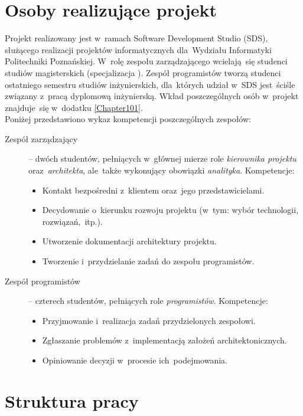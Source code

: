 \section{Osoby realizujące projekt}
\label{Chapter14}

Projekt realizowany jest w~ramach Software Development Studio (SDS), służącego realizacji projektów informatycznych dla~Wydziału Informatyki Politechniki Poznańskiej. W~rolę zespołu zarządzającego wcielają~się studenci studiów magisterskich (specjalizacja ). Zespół programistów tworzą studenci ostatniego semestru studiów inżynierskich, dla~których udział w~SDS jest~ściśle związany z~pracą dyplomową inżynierską. Wkład poszczególnych osób w~projekt znajduje~się w~dodatku \ref{Chapter101}. \\

Poniżej przedstawiono wykaz kompetencji poszczególnych zespołów:
\begin{description}
\item[Zespół zarządzający] -- dwóch studentów, pełniących w~głównej mierze role \emph{kierownika projektu} oraz~\emph{architekta}, ale~także wykonujący obowiązki \emph{analityka}. Kompetencje:
\begin{itemize}
\item Kontakt bezpośredni z~klientem oraz~jego przedstawicielami.
\item Decydowanie o~kierunku rozwoju projektu (w~tym: wybór technologii, rozwiązań,~itp.).
\item Utworzenie dokumentacji architektury projektu.
\item Tworzenie i~przydzielanie zadań do zespołu programistów.
\end{itemize}
\item[Zespół programistów] -- czterech studentów, pełniących role \emph{programistów}. Kompetencje:
\begin{itemize}
\item Przyjmowanie i~realizacja zadań przydzielonych zespołowi.
\item Zgłaszanie problemów z~implementacją założeń architektonicznych.
\item Opiniowanie decyzji w~procesie ich~podejmowania.
\end{itemize}
\end{description}

\section{Struktura pracy}
\label{Chapter15}

